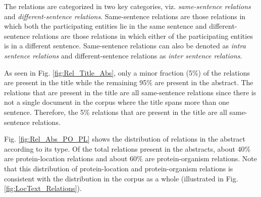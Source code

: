 The relations are categorized in two key categories, viz. \textit{same-sentence relations} and  \textit{different-sentence relations}. Same-sentence relations are those relations in which both the participating entities lie in the same sentence and different-sentence relations are those relations in which either of the participating entities is in a different sentence. Same-sentence relations can also be denoted as \textit{intra sentence relations} and different-sentence relations as \textit{inter sentence relations}.

As seen in Fig. \ref{fig:Rel_Title_Abs}, only a minor fraction (5\%) of the relations are present in the title while the remaining 95\% are present in the abstract. The relations that are present in the title are all same-sentence relations since there is not a single document in the corpus where the title spans more than one sentence. Therefore, the 5\% relations that are present in the title are all same-sentence relations.

Fig. \ref{fig:Rel_Abs_PO_PL} shows the distribution of relations in the abstract according to its type. Of the total relations present in the abstracts, about 40\% are protein-location relations and about 60\% are protein-organism relations. Note that this distribution of protein-location and protein-organism relations is consistent with the distribution in the corpus as a whole (illustrated in Fig. \ref{fig:LocText_Relations}).

